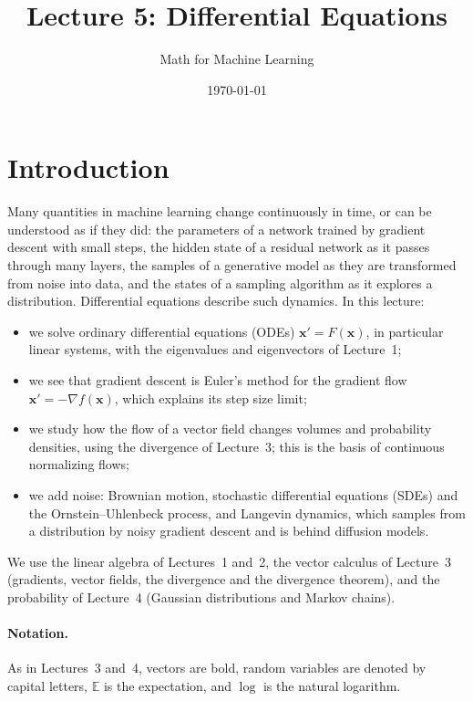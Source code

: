 \documentclass[11pt]{article}
\title{Lecture 5: Differential Equations}
\author{Math for Machine Learning}
\date{\today}
\theoremstyle{definition}
\theoremstyle{plain}
\theoremstyle{remark}
\begin{document}
\maketitle
\tableofcontents

\section*{Introduction}

Many quantities in machine learning change continuously in time, or can be understood as if they did: the parameters of a network trained by gradient descent with small steps, the hidden state of a residual network as it passes through many layers, the samples of a generative model as they are transformed from noise into data, and the states of a sampling algorithm as it explores a distribution. Differential equations describe such dynamics. In this lecture:
\begin{itemize}
    \item we solve ordinary differential equations (ODEs) $\mathbf{x}' = F(\mathbf{x})$, in particular linear systems, with the eigenvalues and eigenvectors of Lecture~1;
    \item we see that gradient descent is Euler's method for the gradient flow $\mathbf{x}' = -\nabla f(\mathbf{x})$, which explains its step size limit;
    \item we study how the flow of a vector field changes volumes and probability densities, using the divergence of Lecture~3; this is the basis of continuous normalizing flows;
    \item we add noise: Brownian motion, stochastic differential equations (SDEs) and the Ornstein--Uhlenbeck process, and Langevin dynamics, which samples from a distribution by noisy gradient descent and is behind diffusion models.
\end{itemize}
We use the linear algebra of Lectures~1 and~2, the vector calculus of Lecture~3 (gradients, vector fields, the divergence and the divergence theorem), and the probability of Lecture~4 (Gaussian distributions and Markov chains).

\paragraph{Notation.} As in Lectures~3 and~4, vectors are bold, random variables are denoted by capital letters, $\mathbb{E}$ is the expectation, and $\log$ is the natural logarithm.
\end{document}
